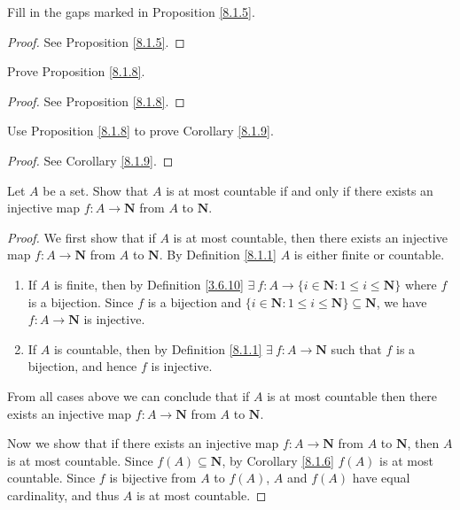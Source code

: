 \begin{exercise}\label{ex 8.1.3}
Fill in the gaps marked in Proposition \ref{8.1.5}.
\end{exercise}

\begin{proof}
See Proposition \ref{8.1.5}.
\end{proof}

\begin{exercise}\label{ex 8.1.4}
Prove Proposition \ref{8.1.8}.
\end{exercise}

\begin{proof}
See Proposition \ref{8.1.8}.
\end{proof}

\begin{exercise}\label{ex 8.1.5}
Use Proposition \ref{8.1.8} to prove Corollary \ref{8.1.9}.
\end{exercise}

\begin{proof}
See Corollary \ref{8.1.9}.
\end{proof}

\begin{exercise}\label{ex 8.1.6}
Let \(A\) be a set.
Show that \(A\) is at most countable if and only if there exists an injective map \(f : A \to \mathbf{N}\) from \(A\) to \(\mathbf{N}\).
\end{exercise}

\begin{proof}
We first show that if \(A\) is at most countable, then there exists an injective map \(f : A \to \mathbf{N}\) from \(A\) to \(\mathbf{N}\).
By Definition \ref{8.1.1} \(A\) is either finite or countable.
\begin{enumerate}
    \item If \(A\) is finite, then by Definition \ref{3.6.10} \(\exists\ f : A \to \{i \in \mathbf{N} : 1 \leq i \leq \mathbf{N}\}\) where \(f\) is a bijection.
    Since \(f\) is a bijection and \(\{i \in \mathbf{N} : 1 \leq i \leq \mathbf{N}\} \subseteq \mathbf{N}\), we have \(f : A \to \mathbf{N}\) is injective.
    \item If \(A\) is countable, then by Definition \ref{8.1.1} \(\exists\ f : A \to \mathbf{N}\) such that \(f\) is a bijection, and hence \(f\) is injective.
\end{enumerate}
From all cases above we can conclude that if \(A\) is at most countable then there exists an injective map \(f : A \to \mathbf{N}\) from \(A\) to \(\mathbf{N}\).

Now we show that if there exists an injective map \(f : A \to \mathbf{N}\) from \(A\) to \(\mathbf{N}\), then \(A\) is at most countable.
Since \(f(A) \subseteq \mathbf{N}\), by Corollary \ref{8.1.6} \(f(A)\) is at most countable.
Since \(f\) is bijective from \(A\) to \(f(A)\), \(A\) and \(f(A)\) have equal cardinality, and thus \(A\) is at most countable.
\end{proof}

